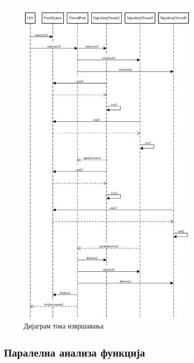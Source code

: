 \documentclass[12pt,oneside]{memoir}
\begin{document}
\begin{figure}[!ht]
  \centering
  \includegraphics[width=0.8\textwidth]{img/seq_diag.png}
  \caption{Дијаграм тока извршавања}
  \label{fig:sekv_dij}
\end{figure}

\subsection{Паралелна анализа функција}
\end{document}
